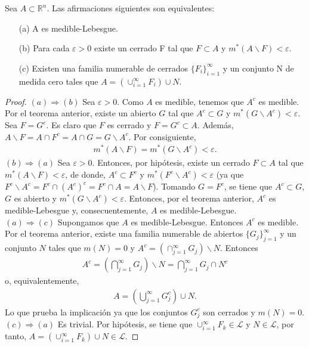 \begin{teo}
Sea $A \subset \mathbb{R}^n$. Las afirmaciones siguientes son equivalentes:
\begin{enumerate}
    \item[(a)] A es medible-Lebesgue.
    \item[(b)] Para cada $\varepsilon > 0$ existe un cerrado F tal que $F \subset A$ y $m^*(A \backslash F) < \varepsilon$.
    \item[(c)] Existen una familia numerable de cerrados $\{F_i\}_{i=1}^{\infty}$ y un conjunto N de medida cero tales que $A = (\cup_{i=1}^{\infty}{F_i}) \cup N$.
\end{enumerate}
\end{teo}

\begin{proof}
$(a) \Longrightarrow (b)$ Sea $\varepsilon > 0$. Como $A$ es medible, tenemos que $A^c$ es medible. Por el teorema anterior, existe un abierto $G$ tal que $A^c \subset G$ y $m^*(G \backslash A^c) < \varepsilon$. Sea $F = G^c$. Es claro que $F$ es cerrado y $F = G^c \subset A$. Además, $A \backslash F = A \cap F^c = A \cap G = G \backslash A^c$. Por consiguiente,
\begin{align*}
    m^*(A \backslash F) = m^*(G \backslash A^c) < \varepsilon.
\end{align*}
$(b) \Longrightarrow (a)$ Sea $\varepsilon > 0$. Entonces, por hipótesis, existe un cerrado $F \subset A$ tal que $m^*(A \backslash F) < \varepsilon$, de donde, $A^c \subset  F^c$ y $m^*(F^c \backslash A^c) < \varepsilon$ (ya que $F^c \backslash A^c = F^c \cap (A^c)^c = F^c \cap A = A \backslash F$). Tomando $G = F^c$, se tiene que $A^c \subset G$, $G$ es abierto y $m^*(G \backslash A^c) < \varepsilon$. Entonces, por el teorema anterior, $A^c$ es medible-Lebesgue y, consecuentemente, $A$ es medible-Lebesgue.
\\
\newline
$(a) \Longrightarrow (c)$ Supongamos que $A$ es medible-Lebesgue. Entonces $A^c$ es medible. Por el teorema anterior, existe una familia numerable de abiertos $\{G_j\}_{j=1}^{\infty}$ y un conjunto $N$ tales que $m(N) = 0$ y $A^c = (\cap_{j=1}^{\infty}{G_j}) \backslash N$. Entonces
\begin{align*}
    A^c = \left( \bigcap_{j=1}^{\infty}{G_j}\right) \backslash N = \bigcap_{j=1}^{\infty}{G_j \cap N^c}
\end{align*}
o, equivalentemente,
\begin{align*}
    A = \left( \bigcup_{j=1}^{\infty}{G_j^c}\right) \cup N.
\end{align*}
Lo que prueba la implicación ya que los conjuntos $G_j^c$ son cerrados y $m(N) = 0$.
\\
\newline
$(c) \Longrightarrow (a)$ Es trivial. Por hipótesis, se tiene que $\cup_{i=1}^{\infty}{F_k} \in \mathcal{L}$ y $N \in \mathcal{L}$, por tanto, $A = (\cup_{i=1}^{\infty}{F_k} )\cup N \in \mathcal{L}$. 
\end{proof}

